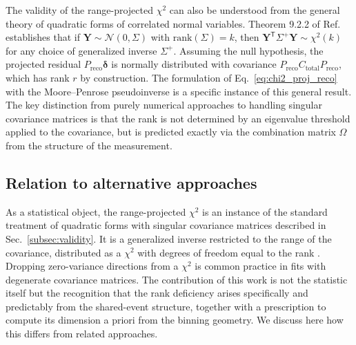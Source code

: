 \documentclass[a4paper,11pt]{article}
\begin{document}
The validity of the range-projected $\chi^{2}$ can also be understood from the general theory of quadratic forms of correlated normal variables. Theorem 9.2.2 of Ref. \cite{Rao:1971} establishes that if $\mathbf{Y} \sim \mathcal{N}(0, \Sigma)$ with $\mathrm{rank}(\Sigma) = k$, then $\mathbf{Y}^{\mathsf{T}} \Sigma^{+} \mathbf{Y} \sim \chi^2(k)$ for any choice of generalized inverse $\Sigma^{+}$. Assuming the null hypothesis, the projected residual $P_{\text{reco}} \boldsymbol{\delta}$ is normally distributed with covariance $P_{\text{reco}} C_{\text{total}} P_{\text{reco}}$, which has rank $r$ by construction. The formulation of Eq.~\eqref{eq:chi2_proj_reco} with the Moore--Penrose pseudoinverse is  a specific instance of this general result. The key distinction from purely numerical approaches to handling singular covariance matrices is that the rank is not determined by an eigenvalue threshold applied to the covariance, but is predicted exactly via the combination matrix $\Omega$ from the structure of the measurement.

\subsection{Relation to alternative approaches}
\label{subsec:alternatives}

As a statistical object, the range-projected $\chi^2$ is an instance of the standard treatment of quadratic forms with singular covariance matrices described in Sec.~\ref{subsec:validity}. It is a generalized inverse restricted to the range of the covariance, distributed as a $\chi^2$ with degrees of freedom equal to the rank \cite{Rao:1971}. Dropping zero-variance directions from a $\chi^2$ is common practice in fits with degenerate covariance matrices. The contribution of this work is not the statistic itself but the recognition that the rank deficiency arises specifically and predictably from the shared-event structure, together with a prescription to compute its dimension a priori from the binning geometry. We discuss here how this differs from related approaches.
\end{document}
